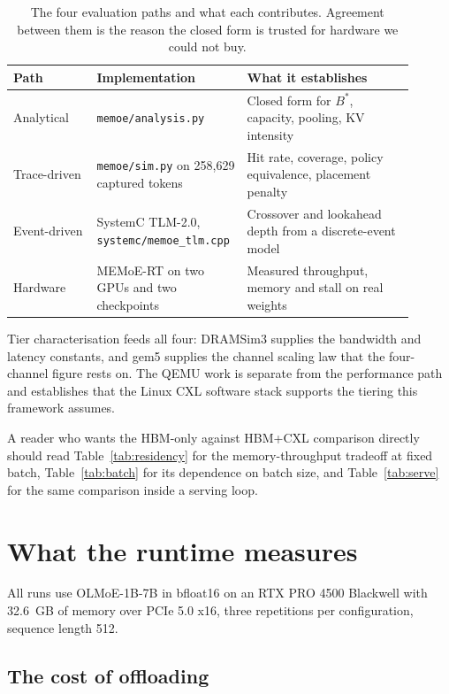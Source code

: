 \documentclass[10pt,a4paper]{article}
\begin{document}
\begin{table}[htbp]
\centering\small
\caption{The four evaluation paths and what each contributes. Agreement between
them is the reason the closed form is trusted for hardware we could not buy.}
\label{tab:framework}
\begin{tabular}{p{0.20\linewidth}p{0.30\linewidth}p{0.40\linewidth}}
\toprule
Path & Implementation & What it establishes \\
\midrule
Analytical
  & \texttt{memoe/analysis.py}
  & Closed form for $B^{*}$, capacity, pooling, KV intensity \\
Trace-driven
  & \texttt{memoe/sim.py} on 258{,}629 captured tokens
  & Hit rate, coverage, policy equivalence, placement penalty \\
Event-driven
  & SystemC TLM-2.0, \texttt{systemc/memoe\_tlm.cpp}
  & Crossover and lookahead depth from a discrete-event model \\
Hardware
  & MEMoE-RT on two GPUs and two checkpoints
  & Measured throughput, memory and stall on real weights \\
\bottomrule
\end{tabular}
\end{table}

Tier characterisation feeds all four: DRAMSim3 supplies the bandwidth and latency
constants, and gem5 supplies the channel scaling law that the four-channel figure
rests on. The QEMU work is separate from the performance path and establishes that
the Linux CXL software stack supports the tiering this framework assumes.

A reader who wants the HBM-only against HBM+CXL comparison directly should read
Table~\ref{tab:residency} for the memory-throughput tradeoff at fixed batch,
Table~\ref{tab:batch} for its dependence on batch size, and
Table~\ref{tab:serve} for the same comparison inside a serving loop.

\section{What the runtime measures}

All runs use OLMoE-1B-7B in bfloat16 on an RTX PRO 4500 Blackwell with 32.6~GB of
memory over PCIe 5.0 x16, three repetitions per configuration, sequence length
512.

\subsection{The cost of offloading}
\end{document}
